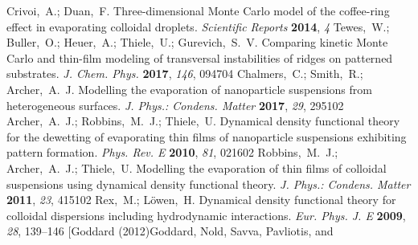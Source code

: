 \documentclass[journal=langd5,manuscript=article]{achemso}
\begin{document}
\begin{mcitethebibliography}{71}
Crivoi,~A.; Duan,~F. Three-dimensional Monte Carlo model of the coffee-ring
  effect in evaporating colloidal droplets. \emph{Scientific Reports}
  \textbf{2014}, \emph{4}\relax
\mciteBstWouldAddEndPuncttrue
\mciteSetBstMidEndSepPunct{\mcitedefaultmidpunct}
{\mcitedefaultendpunct}{\mcitedefaultseppunct}\relax
\EndOfBibitem
{}
Tewes,~W.; Buller,~O.; Heuer,~A.; Thiele,~U.; Gurevich,~S.~V. Comparing kinetic
  Monte Carlo and thin-film modeling of transversal instabilities of ridges on
  patterned substrates. \emph{J. Chem. Phys.} \textbf{2017}, \emph{146},
  094704\relax
\mciteBstWouldAddEndPuncttrue
\mciteSetBstMidEndSepPunct{\mcitedefaultmidpunct}
{\mcitedefaultendpunct}{\mcitedefaultseppunct}\relax
\EndOfBibitem
{}
Chalmers,~C.; Smith,~R.; Archer,~A.~J. Modelling the evaporation of
  nanoparticle suspensions from heterogeneous surfaces. \emph{J. Phys.:
  Condens. Matter} \textbf{2017}, \emph{29}, 295102\relax
\mciteBstWouldAddEndPuncttrue
\mciteSetBstMidEndSepPunct{\mcitedefaultmidpunct}
{\mcitedefaultendpunct}{\mcitedefaultseppunct}\relax
\EndOfBibitem
{}
Archer,~A.~J.; Robbins,~M.~J.; Thiele,~U. Dynamical density functional theory
  for the dewetting of evaporating thin films of nanoparticle suspensions
  exhibiting pattern formation. \emph{Phys. Rev. E} \textbf{2010}, \emph{81},
  021602\relax
\mciteBstWouldAddEndPuncttrue
\mciteSetBstMidEndSepPunct{\mcitedefaultmidpunct}
{\mcitedefaultendpunct}{\mcitedefaultseppunct}\relax
\EndOfBibitem
{}
Robbins,~M.~J.; Archer,~A.~J.; Thiele,~U. Modelling the evaporation of thin
  films of colloidal suspensions using dynamical density functional theory.
  \emph{J. Phys.: Condens. Matter} \textbf{2011}, \emph{23}, 415102\relax
\mciteBstWouldAddEndPuncttrue
\mciteSetBstMidEndSepPunct{\mcitedefaultmidpunct}
{\mcitedefaultendpunct}{\mcitedefaultseppunct}\relax
\EndOfBibitem
{}
Rex,~M.; L{\"o}wen,~H. Dynamical density functional theory for colloidal
  dispersions including hydrodynamic interactions. \emph{Eur. Phys. J. E}
  \textbf{2009}, \emph{28}, 139--146\relax
\mciteBstWouldAddEndPuncttrue
\mciteSetBstMidEndSepPunct{\mcitedefaultmidpunct}
{\mcitedefaultendpunct}{\mcitedefaultseppunct}\relax
\EndOfBibitem
\bibitem[Goddard (2012)Goddard, Nold, Savva, Pavliotis, and

\end{mcitethebibliography}
\end{document}
